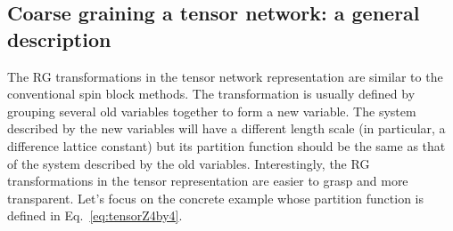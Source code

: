 \documentclass[aps,prb,reprint,superscriptaddress]{revtex4-2}
\begin{document}
\subsection{Coarse graining a tensor network: a general
description\label{cgTN}} The RG transformations in the tensor network
representation are similar to the conventional spin block methods. The
transformation is usually defined by grouping several old variables
together to form a new variable. The system described by the new
variables will have a different length scale (in particular, a
difference lattice constant) but its partition function should be the
same as that of the system described by the old variables.
Interestingly, the RG transformations in the tensor representation are
easier to grasp and more transparent.  Let's focus on the concrete
example whose partition function is defined in
Eq.~\eqref{eq:tensorZ4by4}. 
%
\end{document}
